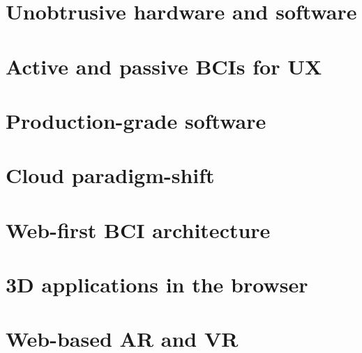 \section{Unobtrusive hardware and software}
\label{chapter2-unobtrusive-hardware-and-software}


\section{Active and passive BCIs for UX}
\label{chapter2-active-and-passive-bcis-for-ux}


\section{Production-grade software}
\label{chapter2-production-grade-software}


\section{Cloud paradigm-shift}
\label{chapter2-cloud-paradigm-shift}


\section{Web-first BCI architecture}
\label{chapter2-web-first-bci-architecture}


\section{3D applications in the browser}
\label{chapter2-3d-applications-in-the-browser}


\section{Web-based AR and VR}
\label{chapter2-web-based-ar-and-vr}

